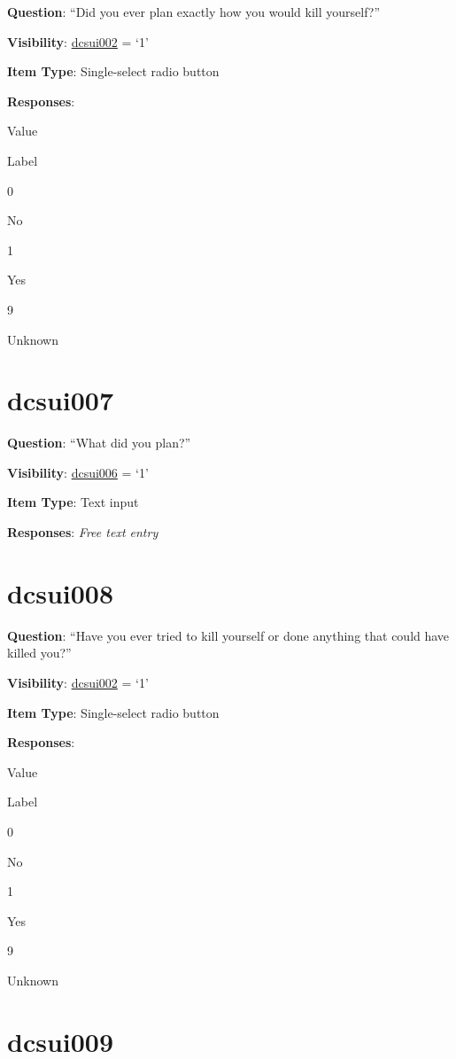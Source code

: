 \documentclass[]{book}
\begin{document}
\textbf{Question}: ``Did you ever plan exactly how you would kill yourself?''

\textbf{Visibility}: \protect\hyperlink{dcsui002}{dcsui002} = `1'

\textbf{Item Type}: Single-select radio button

\textbf{Responses}:

Value

Label

0

No

1

Yes

9

Unknown

\hypertarget{dcsui007}{%
\section{dcsui007}\label{dcsui007}}

\textbf{Question}: ``What did you plan?''

\textbf{Visibility}: \protect\hyperlink{dcsui006}{dcsui006} = `1'

\textbf{Item Type}: Text input

\textbf{Responses}: \emph{Free text entry}

\hypertarget{dcsui008}{%
\section{dcsui008}\label{dcsui008}}

\textbf{Question}: ``Have you ever tried to kill yourself or done anything that could have killed you?''

\textbf{Visibility}: \protect\hyperlink{dcsui002}{dcsui002} = `1'

\textbf{Item Type}: Single-select radio button

\textbf{Responses}:

Value

Label

0

No

1

Yes

9

Unknown

\hypertarget{dcsui009}{%
\section{dcsui009}\label{dcsui009}}
\end{document}
